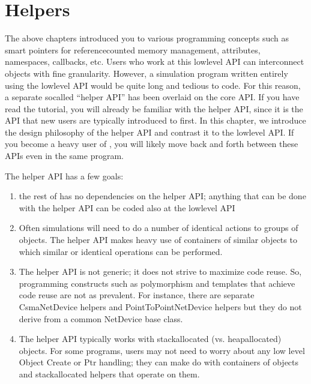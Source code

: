 \documentclass[letterpaper,10pt,english]{sphinxmanual}
\renewcommand{\sphinxcode}[1]{\texttt{\small{#1}}}
\begin{document}
\chapter{Helpers}
\label{\detokenize{helpers:helpers}}\label{\detokenize{helpers::doc}}
The above chapters introduced you to various  programming concepts such as
smart pointers for reference\sphinxhyphen{}counted memory management, attributes, namespaces,
callbacks, etc. Users who work at this low\sphinxhyphen{}level API can interconnect 
objects with fine granularity. However, a simulation program written entirely
using the low\sphinxhyphen{}level API would be quite long and tedious to code. For this
reason, a separate so\sphinxhyphen{}called “helper API” has been overlaid on the core 
API. If you have read the  tutorial, you will already be familiar with the
helper API, since it is the API that new users are typically introduced to
first.  In this chapter, we introduce the design philosophy of the helper API
and contrast it to the low\sphinxhyphen{}level API. If you become a heavy user of , you
will likely move back and forth between these APIs even in the same program.

The helper API has a few goals:
\begin{enumerate}
%
\item {} 
the rest of \sphinxcode{} has no dependencies on the helper API; anything that can
be done with the helper API can be coded also at the low\sphinxhyphen{}level API

\item {} 
 Often simulations will need to do a number of identical
actions to groups of objects. The helper API makes heavy use of containers of
similar objects to which similar or identical operations can be performed.

\item {} 
The helper API is not generic; it does not strive to maximize code reuse. So,
programming constructs such as polymorphism and templates that achieve code
reuse are not as prevalent. For instance, there are separate CsmaNetDevice
helpers and PointToPointNetDevice helpers but they do not derive from a
common NetDevice base class.

\item {} 
The helper API typically works with stack\sphinxhyphen{}allocated (vs. heap\sphinxhyphen{}allocated)
objects. For some programs,  users may not need to worry about any low
level Object Create or Ptr handling; they can make do with containers of
objects and stack\sphinxhyphen{}allocated helpers that operate on them.

\end{enumerate}
\end{document}
